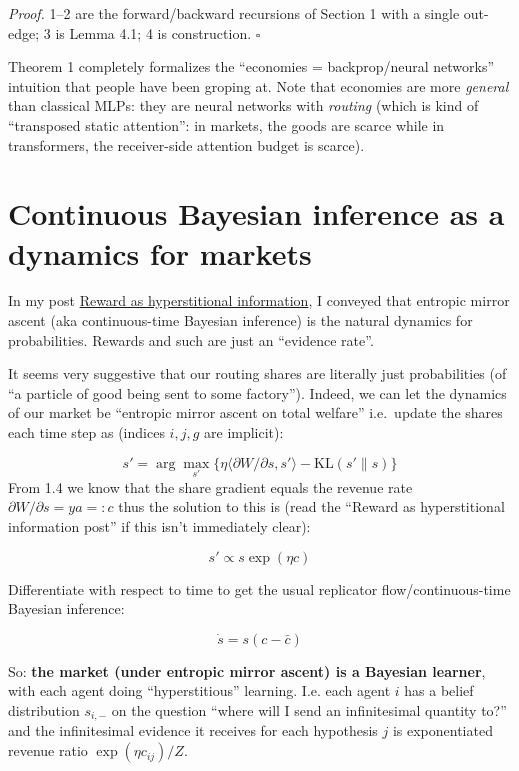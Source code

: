 \emph{Proof.} 1--2 are the forward/backward recursions of Section 1 with a single out-edge; 3 is Lemma 4.1; 4 is construction. \(\square\)

Theorem 1 completely formalizes the ``economies = backprop/neural networks'' intuition that people have been groping at. Note that economies are more \emph{general} than classical MLPs: they are neural networks with \emph{routing} (which is kind of ``transposed static attention'': in markets, the goods are scarce while in transformers, the receiver-side attention budget is scarce).

\hypertarget{continuous-bayesian-inference-as-a-dynamics-for-markets}{%
\section{Continuous Bayesian inference as a dynamics for markets}\label{continuous-bayesian-inference-as-a-dynamics-for-markets}}

In my post \href{https://www.lesswrong.com/posts/z7DBBn9RaDyKJRidg/reward-is-hyperstitional-information}{Reward as hyperstitional information}, I conveyed that entropic mirror ascent (aka continuous-time Bayesian inference) is the natural dynamics for probabilities. Rewards and such are just an ``evidence rate''.

It seems very suggestive that our routing shares are literally just probabilities (of ``a particle of good being sent to some factory''). Indeed, we can let the dynamics of our market be ``entropic mirror ascent on total welfare'' i.e.~update the shares each time step as (indices \(i,j,g\) are implicit):

\[s'=\arg\max_{s'} \{\eta\langle \partial W/\partial s, s'\rangle - \mathrm{KL}(s'\|s)\}\] From 1.4 we know that the share gradient equals the revenue rate \(\partial W/\partial s = ya =: c\) thus the solution to this is (read the ``Reward as hyperstitional information post'' if this isn't immediately clear):

\[s' \propto s \exp{(\eta c)}\tag{4.1}\]

Differentiate with respect to time to get the usual replicator flow/continuous-time Bayesian inference:

\[\dot s = s\left( c - \bar c \right) \tag{4.2}\]

So: \textbf{the market (under entropic mirror ascent) is a Bayesian learner}, with each agent doing ``hyperstitious'' learning. I.e. each agent \(i\) has a belief distribution \(s_{i,-}\) on the question ``where will I send an infinitesimal quantity to?'' and the infinitesimal evidence it receives for each hypothesis \(j\) is exponentiated revenue ratio \(\exp{(\eta c_{ij})}/Z\).

